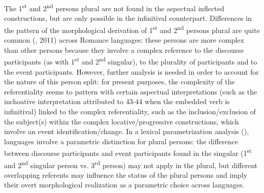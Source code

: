 \documentclass[output=paper]{langsci/langscibook}
\begin{document}
The 1\textsuperscript{st} and 2\textsuperscript{nd} persons plural are not found in the aspectual inflected constructions, but are only possible in the infinitival counterpart. Differences in the pattern of the morphological derivation of 1\textsuperscript{st} and 2\textsuperscript{nd} persons plural are quite common (\citealt{Manzini2005}, 2011) across Romance languages: these persons are more complex than other persons \citep{Bobaljik2008Missing} because they involve a complex reference to the discourse participants (as with 1\textsuperscript{st} and 2\textsuperscript{nd} singular), to the plurality of participants and to the event participants. However, further analysis is needed in order to account for the nature of this person split: for present purposes, the complexity of the referentiality seems to pattern with certain aspectual interpretations (such as the inchoative interpretation attributed to 43-44 when the embedded verb is infinitival) linked to the complex referentiality, such as the inclusion/exclusion of the subject(s) within the complex locative/progressive constructions, which involve an event identification/change. In a lexical parametrization analysis (\citet{Manzini2011Bio}), languages involve a parametric distinction for plural persons: the difference between discourse participants and event participants found in the singular (1\textsuperscript{st} and 2\textsuperscript{nd} singular person vs. 3\textsuperscript{rd} person) may not apply in the plural, but different overlapping referents may influence the status of the plural persons and imply their overt morphological realization as a parametric choice across languages.
\end{document}
